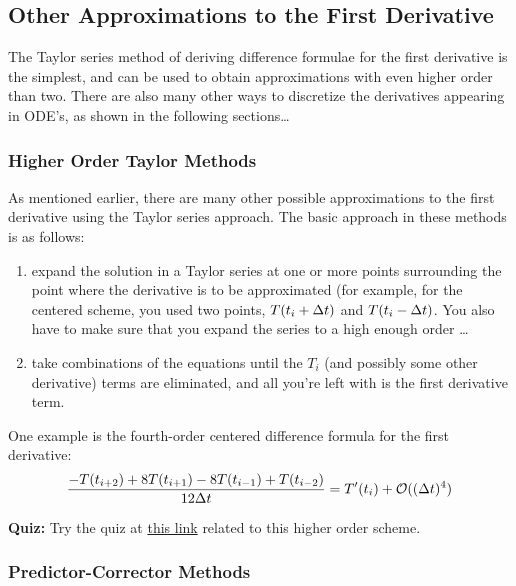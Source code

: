 \subsection{Other Approximations to the First Derivative}
\label{lab2:sec:other}

The Taylor series method of deriving difference formulae for the first
derivative is the simplest, and can be used to obtain approximations
with even higher order than two.  There are also many other ways to
discretize the derivatives appearing in ODE's, as shown in the
following sections\dots

\subsubsection{Higher Order Taylor Methods}
\label{lab2:sec:highorder-taylor}

As mentioned earlier, there are many other possible approximations to
the first derivative using the Taylor series approach.  The basic
approach in these methods is as follows:
\begin{enumerate}
\item expand the solution in a Taylor series at one or more points
  surrounding the point where the derivative is to be approximated
  (for example, for the centered scheme, you used two points,
  $T(t_i+\mbox{$\Delta t$}{})$ and $T(t_i-\mbox{$\Delta t$}{})$.  You also have to make sure that you
  expand the series to a high enough order \dots 
\item take combinations of the equations until the $T_i$ (and possibly
  some other derivative) terms are
  eliminated, and all you're left with is the first derivative term.
\end{enumerate}
One example is the fourth-order centered difference formula for the first
derivative:
\[
  \frac{-T(t_{i+2})+8T(t_{i+1})-8T(t_{i-1})+T(t_{i-2})}{12\mbox{$\Delta t$}{}} =
  T^\prime(t_i) + {\cal O}((\mbox{$\Delta t$}{})^4)
\]

\textbf{Quiz:}  Try the quiz at 
\href{http://clouds.eos.ubc.ca/~phil/numeric/docs/_build/html/quizzes2/order.html}{this link} related to this higher order scheme.

\subsubsection{Predictor-Corrector Methods}
\label{lab2:sec:pred-corr}

